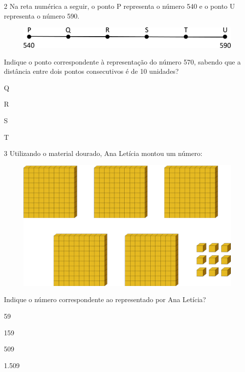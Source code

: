 \num{2} Na reta numérica a seguir, o ponto P representa o número 540 e o ponto U representa o número 590.

\begin{figure}[htpb!]
\centering
\includegraphics[width=\textwidth]{./media/image8.png}
\end{figure}

Indique o ponto correspondente à representação do número 570, sabendo que a
distância entre dois pontos consecutivos é de 10 unidades?

\begin{escolha}
\item
  Q
\item
  R
\item
  S
\item
  T
\end{escolha}

\num{3} Utilizando o material dourado, Ana Letícia montou um número:

\begin{figure}[htpb!]
\centering
\includegraphics[width=\textwidth]{./media/image9.png}
\end{figure}

\item Indique o número correspondente ao representado por Ana Letícia?

\begin{escolha}
\item
  59
\item
  159
\item
  509
\item
  1.509
\end{escolha}


